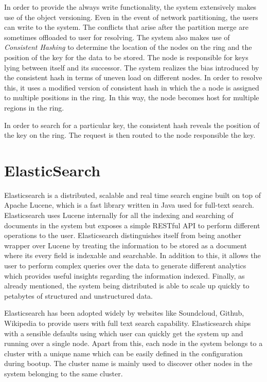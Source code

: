\documentclass[a4paper,11pt]{kth-mag}
\begin{document}
\par In order to provide the always write functionality, the system extensively makes use of the object versioning. Even in the event of network partitioning, the users can write to the system. The conflicts that arise after the partition merge are sometimes offloaded to user for resolving. The system also makes use of \textit{Consistent Hashing} to determine the location of the nodes on the ring and the position of the key for the data to be stored. The node is responsible for keys lying between itself and its successor. The system realizes the bias introduced by the consistent hash in terms of uneven load on different nodes. In order to resolve this, it uses a modified version of consistent hash in which the a node is assigned to multiple positions in the ring. In this way, the node becomes host for multiple regions in the ring.
\par In order to search for a particular key, the consistent hash reveals the position of the key on the ring. The request is then routed to the node responsible the key.


\section{ElasticSearch}

Elasticsearch \cite{elasticsearch} is a distributed, scalable and real time search engine built on top of Apache Lucene, which is a fast library written in Java used for full-text search. Elasticsearch uses Lucene internally for all the indexing and searching of documents in the system but exposes a simple RESTful API to perform different operations to the user. Elasticsearch distinguishes itself from being another wrapper over Lucene by treating the information to be stored as a document where its every field is indexable and searchable. In addition to this, it allows the user to perform complex queries over the data to generate different analytics which provides useful insights regarding the information indexed. Finally, as already mentioned, the system being distributed is able to scale up quickly to petabytes of structured and unstructured data.

\par Elasticsearch has been adopted widely by websites like Soundcloud, Github, Wikipedia to provide users with full text search capability. Elasticsearch ships with a sensible defaults using which user can quickly get the system up and running over a single node. Apart from this, each node in the system belongs to a cluster with a unique name which can be easily defined in the configuration during bootup. The cluster name is mainly used to discover other nodes in the system belonging to the same cluster.
\end{document}
